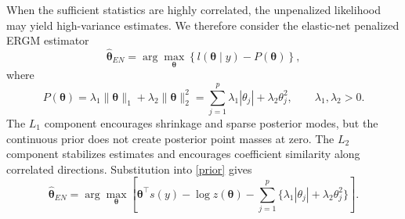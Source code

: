 \documentclass[preprint,12pt,authoryear]{elsarticle}
\def\th{\boldsymbol{\theta}}
\begin{document}
When the sufficient statistics are highly correlated, the unpenalized likelihood may yield high-variance estimates. We therefore consider the elastic-net penalized ERGM estimator
\begin{equation}\label{prior}
\hat{\th}_{EN}
=
\arg\max_{\th}
\left\{l(\th\mid y)-P(\th)\right\},
\end{equation}
where
\[
P(\th)=\lambda_1\|\th\|_1+\lambda_2\|\th\|_2^2
=
\sum_{j=1}^p \lambda_1|\theta_j|+\lambda_2\theta_j^2,
\qquad \lambda_1,\lambda_2>0.
\]
The \(L_1\) component encourages shrinkage and sparse posterior modes, but the continuous prior does not create posterior point masses at zero. The \(L_2\) component stabilizes estimates and encourages coefficient similarity along correlated directions. Substitution into \eqref{prior} gives
\begin{equation}\label{likelihood}
\hat{\th}_{EN}
=
\arg\max_{\th}
\left[
\th^\top s(y)-\log z(\th)
-\sum_{j=1}^p\{\lambda_1|\theta_j|+\lambda_2\theta_j^2\}
\right].
\end{equation}
\end{document}
